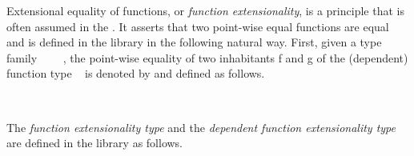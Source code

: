 \documentclass[a4paper,UKenglish,cleveref,autoref,thm-restate,11pt]{lipics-v2021}
\begin{document}
Extensional equality of functions, or \emph{function extensionality}, is a principle that is often assumed in the \agdaualib. It asserts that two point-wise equal functions are equal and is defined in the \typetopology library in the following natural way. First, given a type family ~\AgdaSymbol{:}~~~, the point-wise equality of two inhabitants \ab f and \ab g of the (dependent) function type ~ is denoted by \AgdaSpace{}\AgdaSpace{}\AgdaSpace{}and defined as follows.
\ccpad
\begin{code}
\>[0]\AgdaSpace{}%
\AgdaSymbol{:}\AgdaSpace{}%
\AgdaSymbol{\{}\AgdaSpace{}%
\AgdaSymbol{:}\AgdaSpace{}%
\AgdaSpace{}%
\AgdaSpace{}%
\AgdaSymbol{\}}\AgdaSpace{}%
\AgdaSymbol{\{}\AgdaSpace{}%
\AgdaSymbol{:}\AgdaSpace{}%
\AgdaSpace{}%
\AgdaSpace{}%
%
\AgdaSpace{}%
\AgdaSymbol{\}}\AgdaSpace{}%
\AgdaSpace{}%
\AgdaSpace{}%
\AgdaSpace{}%
\AgdaSpace{}%
\AgdaSpace{}%
\AgdaSpace{}%
\AgdaSpace{}%
\AgdaSpace{}%
\AgdaSpace{}%
%
\<%
\\
\>[0]\AgdaSpace{}%
\AgdaSpace{}%
\AgdaSpace{}%
\AgdaSymbol{=}\AgdaSpace{}%
\AgdaSpace{}%
\AgdaSpace{}%
\AgdaSpace{}%
\AgdaSpace{}%
\AgdaSpace{}%
\AgdaSpace{}%
\AgdaSpace{}%
\<%
\end{code}
\ccpad
The \emph{function extensionality type}  and the \emph{dependent function extensionality type}  are defined in the \typetopology library as follows.
\ccpad
\end{document}
